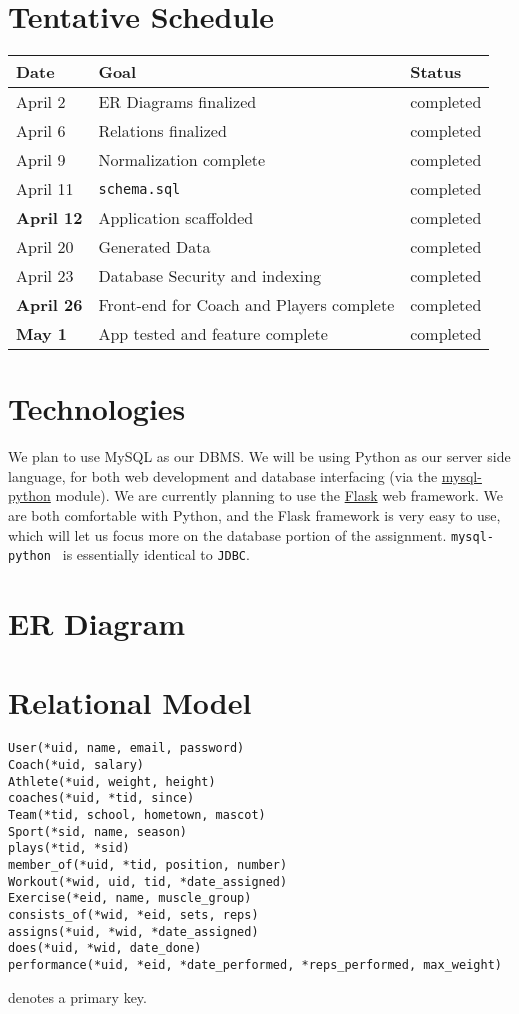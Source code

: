 \documentclass{article}
\begin{document}
    \section*{Tentative Schedule}
    \begin{tabular}{l || l | l}
        Date & Goal & Status \\
        \hline
        April 2 & ER Diagrams finalized & completed \\ 
        April 6 & Relations finalized & completed \\ 
        April 9 & Normalization complete & completed \\ 
        April 11 & {\tt schema.sql} & completed \\ 
        \textbf{April 12} & Application scaffolded & completed \\ 
        April 20 & Generated Data & completed \\ 
        April 23 & Database Security and indexing & completed \\ 
        \textbf{April 26} & Front-end for Coach and Players complete & completed  \\ 
        \textbf{May 1} & App tested and feature complete & completed  \\ 
    \end{tabular}

    \section*{Technologies}
    We plan to use MySQL as our DBMS. We will be using Python as our server side language,
    for both web development and database interfacing (via the 
    \href{http://mysql-python.sourceforge.net/MySQLdb.html}{mysql-python} module). 
    We are currently planning to use the \href{http://flask.pocoo.org/}{Flask} web framework.
    We are both comfortable with Python, and the Flask framework is very easy to use, which
    will let us focus more on the database portion of the assignment. {\tt mysql-python } is
    essentially identical to {\tt JDBC}.

    \section*{ER Diagram}
    

    \section*{Relational Model}
    \begin{verbatim}
User(*uid, name, email, password)
Coach(*uid, salary)
Athlete(*uid, weight, height)
coaches(*uid, *tid, since)
Team(*tid, school, hometown, mascot)
Sport(*sid, name, season)
plays(*tid, *sid)
member_of(*uid, *tid, position, number)
Workout(*wid, uid, tid, *date_assigned)
Exercise(*eid, name, muscle_group)
consists_of(*wid, *eid, sets, reps)
assigns(*uid, *wid, *date_assigned)
does(*uid, *wid, date_done)
performance(*uid, *eid, *date_performed, *reps_performed, max_weight)
    \end{verbatim}
{\tt *} denotes a primary key.
\end{document}
